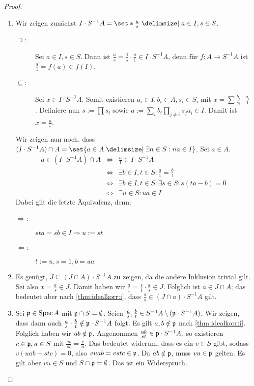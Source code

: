 \documentclass[12pt,a4paper]{scrartcl}
\theoremstyle{cplain}
\theoremstyle{cdef}
\begin{document}
\begin{proof}
	\leavevmode
	\begin{enumerate}[label=\ref{thm:idealkorr:\roman*}]
		\item Wir zeigen zunächst $I\cdot S^{-1}A = \set*{\frac{a}{s}\given a\in I, s\in S}$.
		\begin{description}
			\item[\glqq $\supseteq$\grqq:] Sei $a\in I, s\in S$. Dann ist $\frac as = \frac 1s\cdot \frac a1\in I\cdot S^{-1}A$, denn für $f\colon A\to S^{-1}A$ ist $\frac a1 = f(a) \in f(I)$.
			\item[\glqq$\subseteq$\grqq:] Sei $x\in I\cdot S^{-1}A$. Somit existieren $a_i\in I, b_i\in A, s_i\in S_i$ mit $x = \sum \frac {b_{i}}{s_{i}}\cdot \frac{a_i}1$. Definiere nun $s := \prod s_i$ sowie $a := \sum_ib_i\prod_{j\neq i}s_ja_i\in I$. Damit ist $x = \frac a s$.
		\end{description}
		Wir zeigen nun noch, dass $(I\cdot S^{-1}A)\cap A = \set{a\in A \given \exists n\in S: na\in I}$. Sei $a\in A$.
		\begin{eqnarray*}
			a\in (I\cdot S^{-1}A)\cap A &\Leftrightarrow & \frac a1\in I\cdot S^{-1}A\\
			&\Leftrightarrow& \exists b \in I, t\in S: \frac a1 = \frac bt\\
			&\Leftrightarrow& \exists b\in I, t\in S: \exists s\in S: s(ta-b) =0\\
			&\Leftrightarrow& \exists u\in S: ua\in I
		\end{eqnarray*}
		Dabei gilt die letzte Äquivalenz, denn:
		\begin{description}
			\item[\glqq$\Rightarrow$\grqq:] $sta = sb\in I\Rightarrow u :=  st$
			\item[\glqq$\Leftarrow$\grqq:] $t := u, s = 1, b = ua$
		\end{description}
		\item Es genügt, $J\subseteq (J\cap A)\cdot S^{-1}A$ zu zeigen, da die andere Inklusion trivial gilt. Sei also $x = \frac as\in J$. Damit haben wir $\frac a1 = \frac s1\cdot \frac as \in J$. Folglich ist $a\in J\cap A$; das bedeutet aber nach \ref{thm:idealkorr:i}, dass $\frac as \in (J\cap a)\cdot S^{-1}A$ gilt.
		\item Sei $\mathfrak{p}\in\operatorname{Spec} A$ mit $\mathfrak{p}\cap S=\emptyset$. Seien $\frac as, \frac bt\in S^{-1}A\setminus (\mathfrak{p}\cdot S^{-1}A)$. Wir zeigen, dass dann auch $\frac as\cdot \frac bt\notin\mathfrak{p}\cdot S^{-1}A$ folgt. Es gilt $a,b\notin \mathfrak{p}$ nach \ref{thm:idealkorr:i}. Folglich haben wir $ab\notin \mathfrak{p}$. Angenommen $\frac{ab}{st}\in\mathfrak{p}\cdot S^{-1}A$, so existieren $c\in \mathfrak{p},u\in S$ mit $\frac{ab}{st} = \frac cu$. Das bedeutet widerum, dass es ein $v\in S$ gibt, sodass $v(uab-stc) = 0$, also $vuab = vstc\in \mathfrak{p}$. Da $ab\notin \mathfrak{p}$, muss $vu\in\mathfrak{p}$ gelten. Es gilt aber $vu\in S$ und $S\cap\mathfrak{p} = \emptyset$. Das ist ein Widerspruch.
		

\end{enumerate}
\end{proof}
\end{document}
